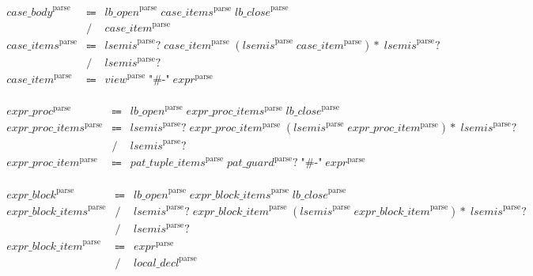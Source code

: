 \begin{align*}
    \begin{array}{rcll}
        \mathit{case\_body}^\mathrm{parse}
        &\Coloneq &\mathit{lb\_open}^\mathrm{parse}\; \mathit{case\_items}^\mathrm{parse}\; \mathit{lb\_close}^\mathrm{parse} \\
        &\mathrel{/} &\mathit{case\_item}^\mathrm{parse} \\
        \mathit{case\_items}^\mathrm{parse}
        &\Coloneq &\mathit{lsemis}^\mathrm{parse}{?}\; \mathit{case\_item}^\mathrm{parse}\; (\mathit{lsemis}^\mathrm{parse}\; \mathit{case\_item}^\mathrm{parse}){*}\; \mathit{lsemis}^\mathrm{parse}{?} \\
        &\mathrel{/} &\mathit{lsemis}^\mathrm{parse}{?} \\
        \mathit{case\_item}^\mathrm{parse}
        &\Coloneq &\mathit{view}^\mathrm{parse}\; \texttt{"\#-"}\; \mathit{expr}^\mathrm{parse}
    \end{array}
\end{align*}

\begin{align*}
    \begin{array}{rcll}
        \mathit{expr\_proc}^\mathrm{parse}
        &\Coloneq &\mathit{lb\_open}^\mathrm{parse}\; \mathit{expr\_proc\_items}^\mathrm{parse}\; \mathit{lb\_close}^\mathrm{parse} \\
        \mathit{expr\_proc\_items}^\mathrm{parse}
        &\Coloneq &\mathit{lsemis}^\mathrm{parse}{?}\; \mathit{expr\_proc\_item}^\mathrm{parse}\; (\mathit{lsemis}^\mathrm{parse}\; \mathit{expr\_proc\_item}^\mathrm{parse}){*}\; \mathit{lsemis}^\mathrm{parse}{?} \\
        &\mathrel{/} &\mathit{lsemis}^\mathrm{parse}{?} \\
        \mathit{expr\_proc\_item}^\mathrm{parse}
        &\Coloneq &\mathit{pat\_tuple\_items}^\mathrm{parse}\; \mathit{pat\_guard}^\mathrm{parse}{?}\; \texttt{"\#-"}\; \mathit{expr}^\mathrm{parse}
    \end{array}
\end{align*}

\begin{align*}
    \begin{array}{rcll}
        \mathit{expr\_block}^\mathrm{parse}
        &\Coloneq &\mathit{lb\_open}^\mathrm{parse}\; \mathit{expr\_block\_items}^\mathrm{parse}\; \mathit{lb\_close}^\mathrm{parse} \\
        \mathit{expr\_block\_items}^\mathrm{parse}
        &\mathrel{/} &\mathit{lsemis}^\mathrm{parse}{?}\; \mathit{expr\_block\_item}^\mathrm{parse}\; (\mathit{lsemis}^\mathrm{parse}\; \mathit{expr\_block\_item}^\mathrm{parse}){*}\; \mathit{lsemis}^\mathrm{parse}{?} \\
        &\mathrel{/} &\mathit{lsemis}^\mathrm{parse}{?} \\
        \mathit{expr\_block\_item}^\mathrm{parse}
        &\Coloneq &\mathit{expr}^\mathrm{parse} \\
        &\mathrel{/} &\mathit{local\_decl}^\mathrm{parse}
    \end{array}
\end{align*}

